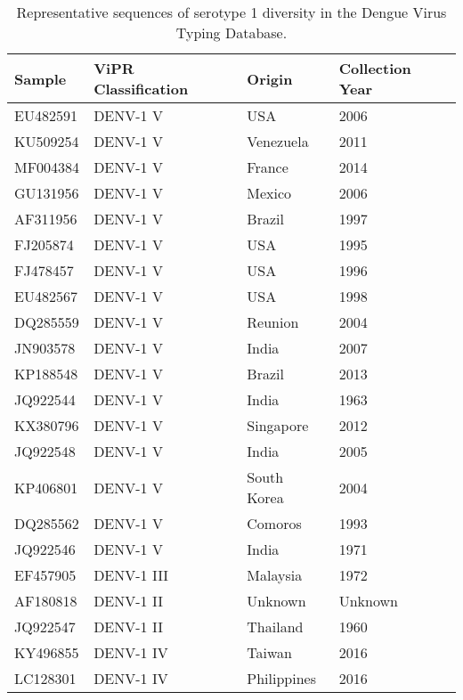 \begin{longtable}{@{}llll@{}}
\caption{Representative sequences of serotype 1 diversity in the Dengue Virus Typing Database.}
\label{tab:chap4_s7}\\ \toprule
Sample   & ViPR Classification & Origin      & Collection Year \\ \midrule
EU482591 & DENV-1 V            & USA         & 2006            \\
KU509254 & DENV-1 V            & Venezuela   & 2011            \\
MF004384 & DENV-1 V            & France      & 2014            \\
GU131956 & DENV-1 V            & Mexico      & 2006            \\
AF311956 & DENV-1 V            & Brazil      & 1997            \\
FJ205874 & DENV-1 V            & USA         & 1995            \\
FJ478457 & DENV-1 V            & USA         & 1996            \\
EU482567 & DENV-1 V            & USA         & 1998            \\
DQ285559 & DENV-1 V            & Reunion     & 2004            \\
JN903578 & DENV-1 V            & India       & 2007            \\
KP188548 & DENV-1 V            & Brazil      & 2013            \\
JQ922544 & DENV-1 V            & India       & 1963            \\
KX380796 & DENV-1 V            & Singapore   & 2012            \\
JQ922548 & DENV-1 V            & India       & 2005            \\
KP406801 & DENV-1 V            & South Korea & 2004            \\
DQ285562 & DENV-1 V            & Comoros     & 1993            \\
JQ922546 & DENV-1 V            & India       & 1971            \\
EF457905 & DENV-1 III          & Malaysia    & 1972            \\
AF180818 & DENV-1 II           & Unknown     & Unknown         \\
JQ922547 & DENV-1 II           & Thailand    & 1960            \\
KY496855 & DENV-1 IV           & Taiwan      & 2016            \\
LC128301 & DENV-1 IV           & Philippines & 2016            \\

\end{longtable}
